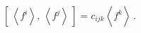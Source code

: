 \begin{equation}\label{ffcf}
{\textstyle [\,\left<f^i\right>,\,\left<f^j\right>\, ]}=c_{ijk}
{\textstyle \left< \right.} f^k {\textstyle \left. \right>}\,.
\end{equation} 
